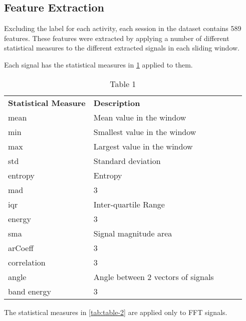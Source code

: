 \subsection{Feature Extraction}
    Excluding the label for each activity, each session in the dataset contains 589 features. These features were extracted by applying a number of different statistical
    measures to the different extracted signals in each sliding window.

    Each signal has the statistical measures in \ref{tab:table-1} applied to them.

    \begin{table}[]
    \begin{tabular}{|l|l|lll}
    \cline{1-2}
    \textbf{Statistical Measure} & \textbf{Description} &  &  &  \\ \cline{1-2}
    mean             & Mean value in the window           &  &  &  \\ \cline{1-2}
    min            & Smallest value in the window           &  &  &  \\ \cline{1-2}
    max            & Largest value in the window           &  &  & \\ \cline{1-2}
    std            & Standard deviation           &  &  & \\ \cline{1-2}
    entropy            & Entropy           &  &  & \\ \cline{1-2}
    mad            & 3           &  &  & \\ \cline{1-2}
    iqr            & Inter-quartile Range           &  &  & \\ \cline{1-2}
    energy            & 3           &  &  & \\ \cline{1-2}
    sma            & Signal magnitude area           &  &  & \\ \cline{1-2}
    arCoeff            & 3           &  &  & \\ \cline{1-2}
    correlation            & 3           &  &  & \\ \cline{1-2}
    angle            & Angle between 2 vectors of signals           &  &  & \\ \cline{1-2}
    band energy            & 3           &  &  & \\ \cline{1-2}
    \end{tabular}
    \caption{Table 1}
    \label{tab:table-1}
    \end{table}

    The statistical measures in \ref{tab:table-2} are applied only to FFT signals.

